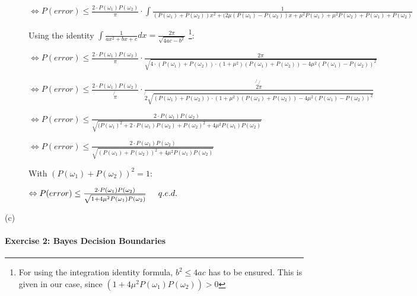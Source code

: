 \documentclass{article}
\begin{document}
\begin{description}
$\Leftrightarrow P(error) \leq \frac{2 \cdot P(\omega_1) P(\omega_2)}{\pi} \cdot \int\frac{1}{(P(\omega_1) + P(\omega_2)) x^2 + (2 \mu (P(\omega_1)-P(\omega_2))x + \mu^2 P(\omega_1) + \mu^2 P(\omega_2) + P(\omega_1) + P(\omega_2)}$ 

\vspace{0.3cm}
Using the identity $\int \frac{1}{ax^2 + bx + c} dx = \frac{2 \pi}{\sqrt{4ac-b^2}}$ \footnote[1]{For using the integration identity formula, $b^2 \leq 4ac$ has to be ensured. This is given in our case, since $(1+ 4 \mu^2 P(\omega_1) P(\omega_2)) > 0$}:
\vspace{0.3cm}

$\Leftrightarrow P(error) \leq \frac{2 \cdot P(\omega_1) P(\omega_2)}{\pi} \cdot \frac{2 \pi}{\sqrt{4 \cdot (P(\omega_1) + P(\omega_2)) \cdot (1 + \mu^2) (P(\omega_1)+P(\omega_2)) - 4 \mu^2 (P(\omega_1) - P(\omega_2))^2 }}$ 

$\Leftrightarrow P(error) \leq \frac{2 \cdot P(\omega_1) P(\omega_2)}{\not{\pi}} \cdot \frac{\not{2} \not{\pi}}{\not{2} \sqrt{(P(\omega_1) + P(\omega_2)) \cdot (1 + \mu^2) (P(\omega_1)+P(\omega_2)) - 4 \mu^2 (P(\omega_1) - P(\omega_2))^2 }}$ 

$\Leftrightarrow P(error) \leq \frac{2 \cdot P(\omega_1) P(\omega_2)}{\sqrt{(P(\omega_1)^2 + 2 \cdot P(\omega_1) P(\omega_2) + P(\omega_2)^2 + 4 \mu^2 P(\omega_1) P(\omega_2) }}$ 

$\Leftrightarrow P(error) \leq \frac{2 \cdot P(\omega_1) P(\omega_2)}{\sqrt{(P(\omega_1) + P(\omega_2))^2 + 4 \mu^2 P(\omega_1) P(\omega_2) }}$ 

\vspace{0.3cm}
With $(P(\omega_1) + P(\omega_2))^2 = 1$:
\vspace{0.3cm}

$\Leftrightarrow P(error) \leq \frac{2 \cdot P(\omega_1) P(\omega_2)}{\sqrt{1 + 4 \mu^2 P(\omega_1) P(\omega_2)}} \hspace{0.5cm} q.e.d.$ 



\item[(c)]




\end{description}

\paragraph{Exercise 2: Bayes Decision Boundaries}
\end{document}
